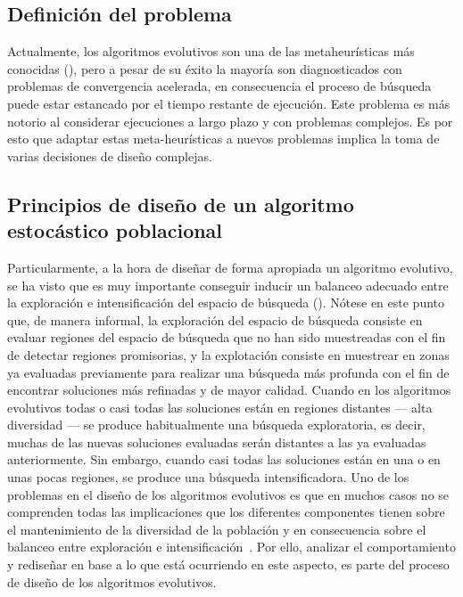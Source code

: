 \subsection{Definición del problema}

Actualmente, los algoritmos evolutivos son una de las metaheurísticas más conocidas (\cite{glover2005handbook}), pero a pesar de su éxito la mayoría son diagnosticados con problemas de convergencia acelerada, en consecuencia el proceso de búsqueda puede estar estancado por el tiempo restante de ejecución.
%
Este problema es más notorio al considerar ejecuciones a largo plazo y con problemas complejos.
%
Es por esto que adaptar estas meta-heurísticas a nuevos problemas implica la toma de varias decisiones de diseño complejas.
%
\subsection{Principios de diseño de un algoritmo estocástico poblacional}

Particularmente, a la hora de diseñar de forma apropiada un algoritmo evolutivo, se ha visto que es muy importante conseguir inducir un balanceo adecuado entre la exploración e intensificación del espacio de búsqueda (\cite{herrera1996adaptation}).
%
Nótese en este punto que, de manera informal, la exploración del espacio de búsqueda consiste en evaluar regiones del espacio de búsqueda que no han sido muestreadas con el fin de detectar regiones promisorias, y la explotación consiste en muestrear en zonas ya evaluadas previamente para realizar una búsqueda más profunda con el fin de encontrar soluciones más refinadas y de mayor calidad.
%
Cuando en los algoritmos evolutivos todas o casi todas las soluciones están en regiones distantes --- alta diversidad --- se produce habitualmente una búsqueda exploratoria, 
es decir, muchas de las nuevas soluciones evaluadas serán distantes a las ya evaluadas anteriormente.
%
Sin embargo, cuando casi todas las soluciones están en una o en unas pocas regiones, se produce una búsqueda intensificadora.
%
Uno de los problemas en el diseño de los algoritmos evolutivos es que en muchos casos no se comprenden todas las implicaciones que los diferentes componentes tienen sobre el mantenimiento de la diversidad de la población y en consecuencia sobre el balanceo entre exploración e intensificación~\cite{Crepinsek:13}.
%
Por ello, analizar el comportamiento y rediseñar en base a lo que está ocurriendo en este aspecto, es parte del proceso de diseño de los algoritmos evolutivos.

